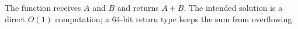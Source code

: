 The function receives $A$ and $B$ and returns $A + B$. The intended solution is
a direct $O(1)$ computation; a 64-bit return type keeps the sum from
overflowing.
